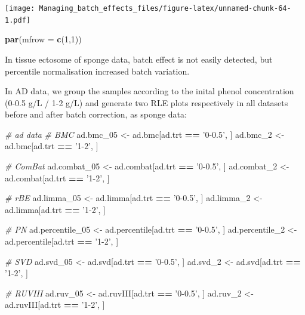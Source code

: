 \documentclass[]{book}
\newenvironment{Shaded}{\begin{snugshade}}{\end{snugshade}}
\newcommand{\KeywordTok}[1]{\textcolor[rgb]{0.13,0.29,0.53}{\textbf{#1}}}
\newcommand{\DataTypeTok}[1]{\textcolor[rgb]{0.13,0.29,0.53}{#1}}
\newcommand{\DecValTok}[1]{\textcolor[rgb]{0.00,0.00,0.81}{#1}}
\newcommand{\StringTok}[1]{\textcolor[rgb]{0.31,0.60,0.02}{#1}}
\newcommand{\CommentTok}[1]{\textcolor[rgb]{0.56,0.35,0.01}{\textit{#1}}}
\newcommand{\OperatorTok}[1]{\textcolor[rgb]{0.81,0.36,0.00}{\textbf{#1}}}
\newcommand{\NormalTok}[1]{#1}
\begin{document}
\texttt{[image: Managing\_batch\_effects\_files/figure-latex/unnamed-chunk-64-1.pdf]}

\begin{Shaded}
\begin{Highlighting}[]
\KeywordTok{par}\NormalTok{(}\DataTypeTok{mfrow =} \KeywordTok{c}\NormalTok{(}\DecValTok{1}\NormalTok{,}\DecValTok{1}\NormalTok{))}
\end{Highlighting}
\end{Shaded}

In tissue ectosome of sponge data, batch effect is not easily detected,
but percentile normalisation increased batch variation.

In AD data, we group the samples according to the inital phenol
concentration (0-0.5 g/L / 1-2 g/L) and generate two RLE plots
respectively in all datasets before and after batch correction, as
sponge data:

\begin{Shaded}
\begin{Highlighting}[]
\CommentTok{# ad data}
\CommentTok{# BMC}
\NormalTok{ad.bmc_}\DecValTok{05}\NormalTok{ <-}\StringTok{ }\NormalTok{ad.bmc[ad.trt }\OperatorTok{==}\StringTok{ '0-0.5'}\NormalTok{, ]}
\NormalTok{ad.bmc_}\DecValTok{2}\NormalTok{ <-}\StringTok{ }\NormalTok{ad.bmc[ad.trt }\OperatorTok{==}\StringTok{ '1-2'}\NormalTok{, ]}

\CommentTok{# ComBat}
\NormalTok{ad.combat_}\DecValTok{05}\NormalTok{ <-}\StringTok{ }\NormalTok{ad.combat[ad.trt }\OperatorTok{==}\StringTok{ '0-0.5'}\NormalTok{, ]}
\NormalTok{ad.combat_}\DecValTok{2}\NormalTok{ <-}\StringTok{ }\NormalTok{ad.combat[ad.trt }\OperatorTok{==}\StringTok{ '1-2'}\NormalTok{, ]}

\CommentTok{# rBE}
\NormalTok{ad.limma_}\DecValTok{05}\NormalTok{ <-}\StringTok{ }\NormalTok{ad.limma[ad.trt }\OperatorTok{==}\StringTok{ '0-0.5'}\NormalTok{, ]}
\NormalTok{ad.limma_}\DecValTok{2}\NormalTok{ <-}\StringTok{ }\NormalTok{ad.limma[ad.trt }\OperatorTok{==}\StringTok{ '1-2'}\NormalTok{, ]}

\CommentTok{# PN}
\NormalTok{ad.percentile_}\DecValTok{05}\NormalTok{ <-}\StringTok{ }\NormalTok{ad.percentile[ad.trt }\OperatorTok{==}\StringTok{ '0-0.5'}\NormalTok{, ]}
\NormalTok{ad.percentile_}\DecValTok{2}\NormalTok{ <-}\StringTok{ }\NormalTok{ad.percentile[ad.trt }\OperatorTok{==}\StringTok{ '1-2'}\NormalTok{, ]}

\CommentTok{# SVD}
\NormalTok{ad.svd_}\DecValTok{05}\NormalTok{ <-}\StringTok{ }\NormalTok{ad.svd[ad.trt }\OperatorTok{==}\StringTok{ '0-0.5'}\NormalTok{, ]}
\NormalTok{ad.svd_}\DecValTok{2}\NormalTok{ <-}\StringTok{ }\NormalTok{ad.svd[ad.trt }\OperatorTok{==}\StringTok{ '1-2'}\NormalTok{, ]}

\CommentTok{# RUVIII}
\NormalTok{ad.ruv_}\DecValTok{05}\NormalTok{ <-}\StringTok{ }\NormalTok{ad.ruvIII[ad.trt }\OperatorTok{==}\StringTok{ '0-0.5'}\NormalTok{, ]}
\NormalTok{ad.ruv_}\DecValTok{2}\NormalTok{ <-}\StringTok{ }\NormalTok{ad.ruvIII[ad.trt }\OperatorTok{==}\StringTok{ '1-2'}\NormalTok{, ]}
\end{Highlighting}
\end{Shaded}
\end{document}
